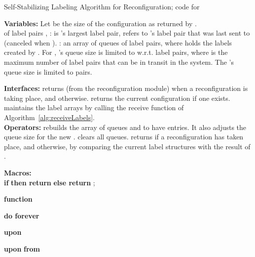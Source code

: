 \documentclass[11pt]{article}
\begin{document}
\begin{algorithm*}[t!]
\caption{{Self-Stabilizing Labeling Algorithm for Reconfiguration; code for }}
\label{alg:configLabeling}


\begin{footnotesize}

{\bf Variables:} Let  be the size of the configuration  as returned by .\\
 of label pairs , :  is 's largest label pair,  refers to 's  label pair that was last sent to  (canceled when ).
: an array of queues of label pairs, where  holds the labels created by . For , 's queue size is limited to  w.r.t. label pairs, where  is the maximum number of label pairs that can be in transit in the system. The 's queue size is limited to  pairs.

{\bf Interfaces:}
 returns  (from the reconfiguration module) when a reconfiguration is taking place, and  otherwise.
 returns the current configuration if one exists.
 maintains the label arrays by calling the receive function of Algorithm~\ref{alg:receiveLabels}.\\
{\bf Operators:}
 rebuilds the  array of queues and  to have  entries. It also adjusts the queue size for the new .
 clears all  queues.
 returns  if a reconfiguration has taken place, and  otherwise, by comparing the current label structures with the result of .

{\bf Macros:}\\  {\bf if}    {\bf then return}  {\bf else return }; 
\label{LAB:cleanLP}



{\bf function}  \lForEach{}{} \label{LAB:cleanMax}




{\bf do forever} \label{LAB:doForever}\Begin{

\If{ \label{LAB:uponConfChange}}{
\; \label{LAB:newSize}
\; \label{LAB:rebuild}
\;\label{LAB:emptyQs}
\;\label{LAB:cleanUponReconf}
\; \label{LAB:findNewMax}
}
}

{\bf upon} \label{LAB:beginTransmit} 


{\bf upon}  {\bf from}  \Begin{  \label{LAB:uponReceive}
\If{}{
\; \label{LAB:receiveCleanMax}
\;\label{LAB:cleanReceived}
\; \label{LAB:receiveAction}
} 
}


\end{footnotesize}
\end{algorithm*}
\end{document}
